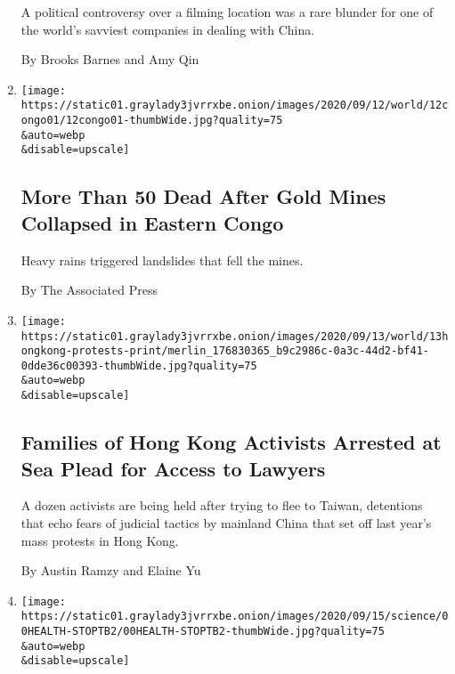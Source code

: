 \begin{enumerate}
  A political controversy over a filming location was a rare blunder for
  one of the world's savviest companies in dealing with China.

  By Brooks Barnes and Amy Qin
\item
  \href{/2020/09/12/world/africa/congo-gold-mine-collapse.html}{}

  \texttt{[image: https://static01.graylady3jvrrxbe.onion/images/2020/09/12/world/12congo01/12congo01-thumbWide.jpg?quality=75\\\&auto=webp\\\&disable=upscale]}

  \hypertarget{more-than-50-dead-after-gold-mines-collapsed-in-eastern-congo}{%
  \subsection{More Than 50 Dead After Gold Mines Collapsed in Eastern
  Congo}\label{more-than-50-dead-after-gold-mines-collapsed-in-eastern-congo}}

  Heavy rains triggered landslides that fell the mines.

  By The Associated Press
\item
  \href{/2020/09/12/world/asia/hong-kong-activists-china.html}{}

  \texttt{[image: https://static01.graylady3jvrrxbe.onion/images/2020/09/13/world/13hongkong-protests-print/merlin\_176830365\_b9c2986c-0a3c-44d2-bf41-0dde36c00393-thumbWide.jpg?quality=75\\\&auto=webp\\\&disable=upscale]}

  \hypertarget{families-of-hong-kong-activists-arrested-at-sea-plead-for-access-to-lawyers}{%
  \subsection{Families of Hong Kong Activists Arrested at Sea Plead for
  Access to
  Lawyers}\label{families-of-hong-kong-activists-arrested-at-sea-plead-for-access-to-lawyers}}

  A dozen activists are being held after trying to flee to Taiwan,
  detentions that echo fears of judicial tactics by mainland China that
  set off last year's mass protests in Hong Kong.

  By Austin Ramzy and Elaine Yu
\item
  \href{/2020/09/12/health/ditiu-stoptb-united-nations.html}{}

  \texttt{[image: https://static01.graylady3jvrrxbe.onion/images/2020/09/15/science/00HEALTH-STOPTB2/00HEALTH-STOPTB2-thumbWide.jpg?quality=75\\\&auto=webp\\\&disable=upscale]}


\end{enumerate}
